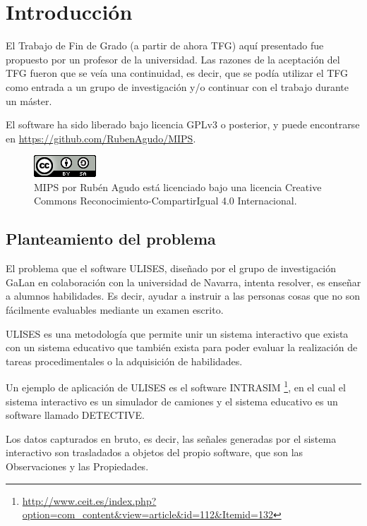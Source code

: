 \chapter{Introducci\'{o}n} 
El Trabajo de Fin de Grado (a partir de ahora TFG) aqu\'{i} presentado fue propuesto por un profesor de la universidad.
Las razones de la aceptaci\'{o}n del TFG fueron que se ve\'{i}a una continuidad, es decir, que se pod\'{i}a 
utilizar el TFG como entrada a un grupo de investigaci\'{o}n y/o continuar con el trabajo durante un m\'{a}ster.

El software ha sido liberado bajo licencia GPLv3 o posterior, y puede encontrarse en 
\url{https://github.com/RubenAgudo/MIPS}.

\begin{figure}[h]
    \centering
    \includegraphics{./Figures/cc-by-sa}
    \caption[Licencia]{MIPS por Rub\'en Agudo est\'a licenciado bajo una 
    licencia Creative Commons Reconocimiento-CompartirIgual 4.0 Internacional.}
    \label{fig:cc-by-sa}
\end{figure}

\section{Planteamiento del problema}
El problema que el software ULISES, dise\~nado por el grupo de investigaci\'on GaLan en colaboraci\'on
con la universidad de Navarra, intenta resolver, es ense\~nar a alumnos habilidades. Es decir, ayudar a 
instruir a las personas cosas que no son f\'acilmente evaluables mediante un examen escrito.

ULISES es una metodolog\'ia que permite unir un sistema interactivo que exista
con un sistema educativo que tambi\'en exista para poder evaluar la realizaci\'on de tareas procedimentales 
o la adquisici\'on de habilidades.

Un ejemplo de aplicaci\'on de ULISES es el software INTRASIM 
\footnote{\url{http://www.ceit.es/index.php?option=com_content&view=article&id=112&Itemid=132}}, 
en el cual el sistema interactivo es un simulador de camiones y el sistema educativo es un software
llamado DETECTIVE.

Los datos capturados en bruto, es decir, las se\~nales generadas por el sistema 
interactivo son trasladados a objetos del propio software, que son las 
Observaciones y las Propiedades.

